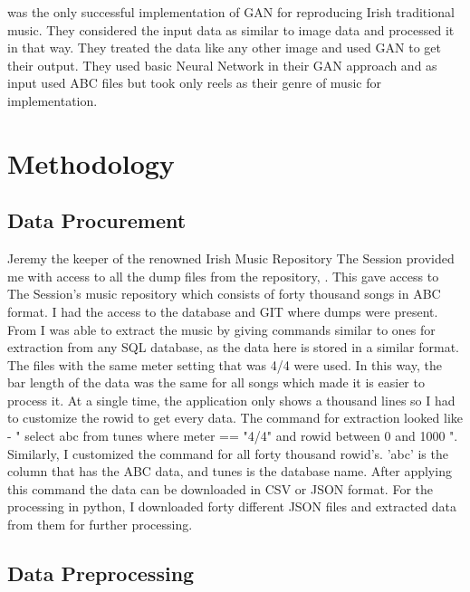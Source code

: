 \documentclass[oneside,12pt]{Classes/RoboticsLaTeX}
\begin{document}
\cite{GanReels} was the only successful implementation of GAN for reproducing Irish traditional music. They considered the input data as similar to image data and processed it in that way. They treated the data like any other image and used GAN to get their output. They used basic Neural Network in their GAN approach and as input used ABC files but took only reels as their genre of music for implementation.

\chapter{Methodology}
\label{chap:methodology}

\section{Data Procurement}

Jeremy the keeper of the renowned Irish Music Repository The Session provided me with access to all the dump files from the repository, \cite{session}. This gave access to The Session's music repository which consists of forty thousand songs in ABC format. I had the access to the database and GIT where dumps were present. From \cite{database} I was able to extract the music by giving commands similar to ones for extraction from any SQL database, as the data here is stored in a similar format. The files with the same meter setting that was 4/4 were used. In this way, the bar length of the data was the same for all songs which made it is easier to process it. At a single time, the application only shows a thousand lines so I had to customize the rowid to get every data. The command for extraction looked like - " select abc from tunes where meter == "4/4" and rowid between 0 and 1000 ". Similarly, I customized the command for all forty thousand rowid's. 'abc' is the column that has the ABC data, and tunes is the database name. After applying this command the data can be downloaded in CSV or JSON format. For the processing in python, I downloaded forty different JSON files and extracted data from them for further processing.

\section{Data Preprocessing}
\end{document}
